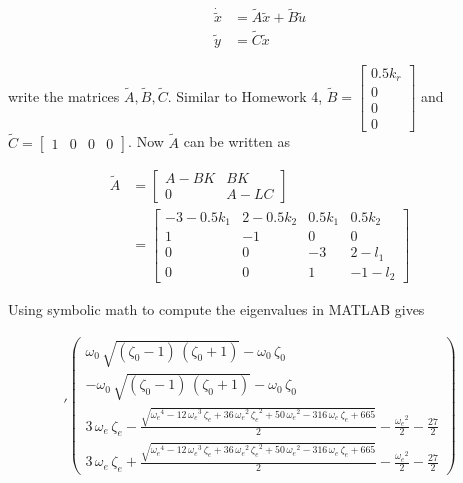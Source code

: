\documentclass[11pt]{article}
\theoremstyle{definition}
\begin{document}
\begin{enumerate}
\begin{enumerate}
        \begin{align*}
            \dot{\tilde{x}} &= \tilde{A}\tilde{x} + \tilde{B}\tilde{u} \\
            \tilde{y} &= \tilde{C}\tilde{x}
        \end{align*}

        write the matrices $\tilde{A}, \tilde{B}, \tilde{C}$.  Similar to Homework 4, $\tilde{B} = \begin{bmatrix} 0.5 k_r \\ 0 \\ 0 \\ 0 \end{bmatrix}$ and $\tilde{C} = \begin{bmatrix} 1 & 0 & 0 & 0 \end{bmatrix}$.  Now $\tilde{A}$ can be written as 

        \begin{align*}
            \tilde{A} &= \begin{bmatrix} A - BK & BK \\ 0 & A - LC \end{bmatrix} \\
            &= \begin{bmatrix} -3 - 0.5k_1 & 2 - 0.5k_2 & 0.5k_1 & 0.5k_2 \\
                                1 & -1 & 0 & 0 \\
                                0 & 0 & -3 & 2 - l_1 \\
                                0 & 0 & 1 & -1 - l_2 \end{bmatrix}
        \end{align*}

        Using symbolic math to compute the eigenvalues in MATLAB gives

        \begin{align*}
            '\left(\begin{array}{c} \omega _{0}\,\sqrt{\left(\zeta _{0}-1\right)\,\left(\zeta _{0}+1\right)}-\omega _{0}\,\zeta _{0}\\ -\omega _{0}\,\sqrt{\left(\zeta _{0}-1\right)\,\left(\zeta _{0}+1\right)}-\omega _{0}\,\zeta _{0}\\ 3\,\omega _{e}\,\zeta _{e}-\frac{\sqrt{{\omega _{e}}^4-12\,{\omega _{e}}^3\,\zeta _{e}+36\,{\omega _{e}}^2\,{\zeta _{e}}^2+50\,{\omega _{e}}^2-316\,\omega _{e}\,\zeta _{e}+665}}{2}-\frac{{\omega _{e}}^2}{2}-\frac{27}{2}\\ 3\,\omega _{e}\,\zeta _{e}+\frac{\sqrt{{\omega _{e}}^4-12\,{\omega _{e}}^3\,\zeta _{e}+36\,{\omega _{e}}^2\,{\zeta _{e}}^2+50\,{\omega _{e}}^2-316\,\omega _{e}\,\zeta _{e}+665}}{2}-\frac{{\omega _{e}}^2}{2}-\frac{27}{2} \end{array}\right)
        \end{align*}


\end{enumerate}
\end{enumerate}
\end{document}
